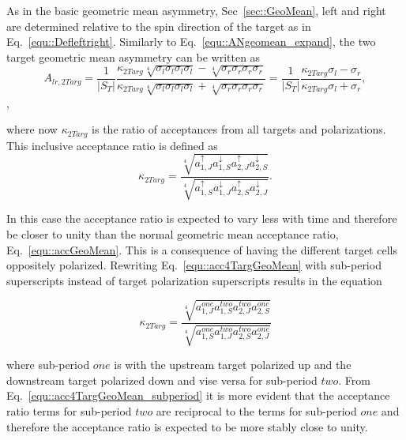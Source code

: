 As in the basic geometric mean asymmetry, Sec~\ref{sec::GeoMean}, left and right
are determined relative to the spin direction of the target as in
Eq.~\ref{equ::Defleftright}.  Similarly to Eq.~\ref{equ::ANgeomean_expand}, the
two target geometric mean asymmetry can be written as
\begin{equation}
  A_{lr,2Targ}= \frac{1}{|S_T|}
  \frac{
    \kappa_{2Targ} \sqrt[4]{\sigma_l\sigma_l\sigma_l\sigma_l} -
    \sqrt[4]{\sigma_r\sigma_r\sigma_r\sigma_r}
  }{
    \kappa_{2Targ} \sqrt[4]{\sigma_l\sigma_l\sigma_l\sigma_l} +
    \sqrt[4]{\sigma_r\sigma_r\sigma_r\sigma_r}
  }
  =
  \frac{1}{|S_T|}
  \frac{\kappa_{2Targ}\sigma_l - \sigma_r}{
    \kappa_{2Targ}\sigma_l + \sigma_r},
\end{equation},

\noindent
where now $\kappa_{2Targ}$ is the ratio of acceptances from all targets and
polarizations.  This inclusive acceptance ratio is defined as
\begin{equation}
  \label{equ::acc4TargGeoMean}
  \kappa_{2Targ} =
  \frac{
    \sqrt[4]{
      a^\uparrow_{1,J}
      a^\downarrow_{1,S}
      a^\uparrow_{2,J}
      a^\downarrow_{2,S}}
  }{
    \sqrt[4]{
      a^\uparrow_{1,S}
      a^\downarrow_{1,J}
      a^\uparrow_{2,S}
      a^\downarrow_{2,J}}
  }.
\end{equation}

\noindent
In this case the acceptance ratio is expected to vary less with time and
therefore be closer to unity than the normal geometric mean acceptance ratio,
Eq.~\ref{equ::accGeoMean}.  This is a consequence of having the different target
cells oppositely polarized.  Rewriting Eq.~\ref{equ::acc4TargGeoMean} with
sub-period superscripts instead of target polarization superscripts results in
the equation

\begin{equation}
  \label{equ::acc4TargGeoMean_subperiod}
  \kappa_{2Targ} =
  \frac{ \sqrt[4]{ a^{one}_{1,J} a^{two}_{1,S} a^{two}_{2,J} a^{one}_{2,S} }
  }{
    \sqrt[4]{ a^{one}_{1,S} a^{two}_{1,J} a^{two}_{2,S} a^{one}_{2,J} }
  }
\end{equation}

\noindent
where sub-period $one$ is with the upstream target polarized up and the
downstream target polarized down and vise versa for sub-period $two$.  From
Eq.~\ref{equ::acc4TargGeoMean_subperiod} it is more evident that the acceptance
ratio terms for sub-period $two$ are reciprocal to the terms for sub-period
$one$ and therefore the acceptance ratio is expected to be more stably close to
unity.

